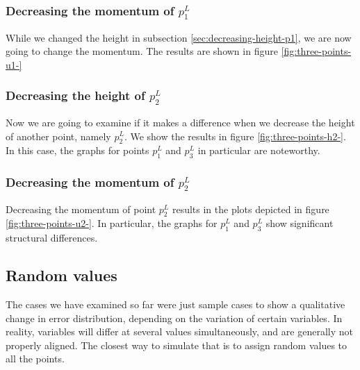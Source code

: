 \documentclass[a4paper, twoside]{article}
\begin{document}
\subsubsection{\texorpdfstring{Decreasing the momentum of $p_1^L$}{Decreasing the momentum of p1L}}
\label{sec:decreasing-momentum-p1}

While we changed the height in subsection \ref{sec:decreasing-height-p1}, we are now going to change the momentum. The results are shown in figure \ref{fig:three-points-u1-}



\subsubsection{\texorpdfstring{Decreasing the height of $p_2^L$}{Decreasing the height of p2L}}
\label{sec:decreasing-height-p2}

Now we are going to examine if it makes a difference when we decrease the height of another point, namely $p_2^L$. We show the results in figure \ref{fig:three-points-h2-}. In this case, the graphs for points $p_1^L$ and $p_3^L$ in particular are noteworthy.



\subsubsection{\texorpdfstring{Decreasing the momentum of $p_2^L$}{Decreasing the momentum of p2L}}
\label{sec:decreasing-momentum-of-p2}

Decreasing the momentum of point $p_2^L$ results in the plots depicted in figure \ref{fig:three-points-u2-}. In particular, the graphs for $p_1^L$ and $p_3^L$ show significant structural differences.



\subsection{Random values}
\label{sec:random-values}

The cases we have examined so far were just sample cases to show a qualitative change in error distribution, depending on the variation of certain variables. In reality, variables will differ at several values simultaneously, and are generally not properly aligned. The closest way to simulate that is to assign random values to all the points.
\end{document}
